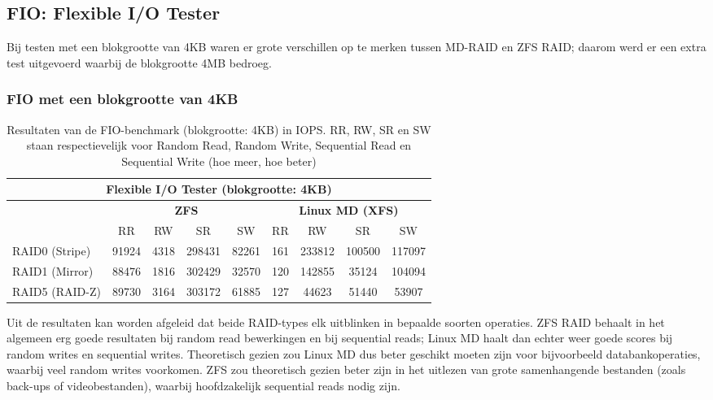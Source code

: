 \subsection{FIO: Flexible I/O Tester}

Bij testen met een blokgrootte van 4KB waren er grote verschillen op te merken tussen MD-RAID en ZFS RAID; daarom werd er een extra test uitgevoerd waarbij de blokgrootte 4MB bedroeg. 

\subsubsection{FIO met een blokgrootte van 4KB}

\begin{table}[h]
  \centering
  \begin{tabular}{l || c c c c | c c c c}
    \hline
    \multicolumn{9}{c}{\textbf{Flexible I/O Tester (blokgrootte: 4KB)}} \\
    \hline
    & \multicolumn{4}{c|}{\textbf{ZFS}} & \multicolumn{4}{|c}{\textbf{Linux MD (XFS)}} \\
    & RR & RW & SR & SW & RR & RW & SR & SW \\
    \hline
    RAID0 (Stripe) & 91924 & 4318 & 298431 & 82261 & 161 & 233812 & 100500  & 117097  \\
    RAID1 (Mirror) & 88476 & 1816 & 302429 & 32570 & 120 & 142855 & 35124  & 104094 \\
    RAID5 (RAID-Z) & 89730 & 3164 & 303172 & 61885 & 127 & 44623 & 51440  & 53907 \\
  \end{tabular}
  \caption{Resultaten van de FIO-benchmark (blokgrootte: 4KB) in IOPS. RR, RW, SR en SW staan respectievelijk voor Random Read, Random Write, Sequential Read en Sequential Write (hoe meer, hoe beter)}
  \label{tab:results_fio_4k}
\end{table}

Uit de resultaten kan worden afgeleid dat beide RAID-types elk uitblinken in bepaalde soorten operaties. ZFS RAID behaalt in het algemeen erg goede resultaten bij random read bewerkingen en bij sequential reads; Linux MD haalt dan echter weer goede scores bij random writes en sequential writes. Theoretisch gezien zou Linux MD dus beter geschikt moeten zijn voor bijvoorbeeld databankoperaties, waarbij veel random writes voorkomen. ZFS zou theoretisch gezien beter zijn in het uitlezen van grote samenhangende bestanden (zoals back-ups of videobestanden), waarbij hoofdzakelijk sequential reads nodig zijn.  


